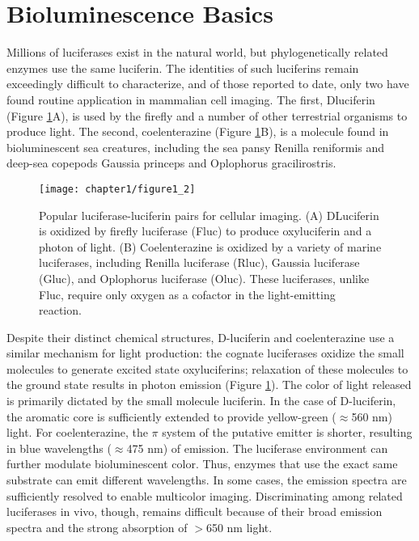 \section{Bioluminescence Basics}
Millions of luciferases exist in the natural world, but
phylogenetically related enzymes use the same luciferin.\cite{Martini:2017ig} The
identities of such luciferins remain exceedingly difficult to
characterize, and of those reported to date, only two have found
routine application in mammalian cell imaging.\cite{RN26} The first, Dluciferin
(Figure \ref{fig:luc_oxidation}A), is used by the firefly and a number of
other terrestrial organisms to produce light. The second,
coelenterazine (Figure \ref{fig:luc_oxidation}B), is a molecule found in bioluminescent
sea creatures, including the sea pansy Renilla
reniformis and deep-sea copepods Gaussia princeps and
Oplophorus gracilirostris. 

\begin{figure}[htbp]
\texttt{[image: chapter1/figure1\_2]}
\centering
\caption{Popular luciferase-luciferin pairs for cellular imaging. (A) DLuciferin
is oxidized by firefly luciferase (Fluc) to produce oxyluciferin
and a photon of light. (B) Coelenterazine is oxidized by a variety of
marine luciferases, including Renilla luciferase (Rluc), Gaussia
luciferase (Gluc), and Oplophorus luciferase (Oluc). These luciferases,
unlike Fluc, require only oxygen as a cofactor in the light-emitting
reaction.}
  \label{fig:luc_oxidation}
\end{figure}

Despite their distinct chemical
structures, D-luciferin and coelenterazine use a similar
mechanism for light production: the cognate luciferases oxidize
the small molecules to generate excited state oxyluciferins;
relaxation of these molecules to the ground state results in
photon emission (Figure \ref{fig:luc_oxidation}).
The color of light released is primarily dictated by the small
molecule luciferin. In the case of D-luciferin, the aromatic core
is sufficiently extended to provide yellow-green ($\approx$560 nm)
light. For coelenterazine, the $\pi$ system of the putative emitter is
shorter, resulting in blue wavelengths ($\approx$475 nm) of emission.
The luciferase environment can further modulate bioluminescent
color. Thus, enzymes that use the exact same substrate can
emit different wavelengths. In some cases, the emission spectra
are sufficiently resolved to enable multicolor imaging.\cite{Suzuki:2016jw}
Discriminating among related luciferases in vivo, though,
remains difficult because of their broad emission spectra and
the strong absorption of $>$650 nm light.\cite{Zhao:2005if}
